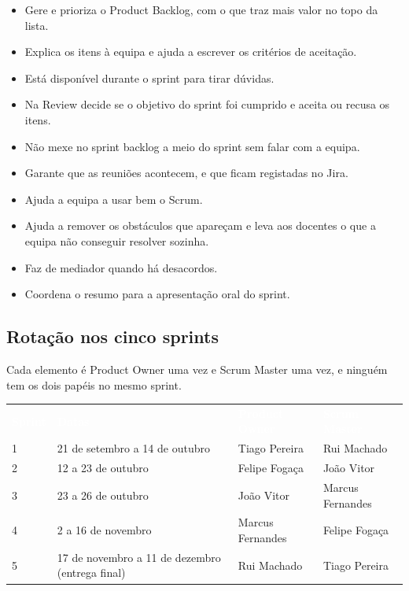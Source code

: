 \documentclass[11pt,a4paper]{article}
\newcommand{\th}[1]{\textcolor{white}{\sffamily\bfseries #1}}
\begin{document}
\begin{tcolorbox}[caixa, title={Product Owner}]
  \begin{itemize}
    \item Gere e prioriza o Product Backlog, com o que traz mais valor no topo da lista.
    \item Explica os itens à equipa e ajuda a escrever os critérios de aceitação.
    \item Está disponível durante o sprint para tirar dúvidas.
    \item Na Review decide se o objetivo do sprint foi cumprido e aceita ou recusa os itens.
    \item Não mexe no sprint backlog a meio do sprint sem falar com a equipa.
  \end{itemize}
\end{tcolorbox}

\begin{tcolorbox}[caixa, title={Scrum Master}]
  \begin{itemize}
    \item Garante que as reuniões acontecem, e que ficam registadas no Jira.
    \item Ajuda a equipa a usar bem o Scrum.
    \item Ajuda a remover os obstáculos que apareçam e leva aos docentes o que a equipa não conseguir resolver sozinha.
    \item Faz de mediador quando há desacordos.
    \item Coordena o resumo para a apresentação oral do sprint.
  \end{itemize}
\end{tcolorbox}

\subsection{Rotação nos cinco sprints}

Cada elemento é Product Owner uma vez e Scrum Master uma vez, e ninguém tem os dois papéis no mesmo sprint.

\renewcommand{\arraystretch}{1.5}
\begin{tabularx}{\textwidth}{N{1.6cm} L{5.2cm} Y Y}
   \th{Sprint} & \th{Datas} & \th{Product Owner} & \th{Scrum Master} \\
   1 & 21 de setembro a 14 de outubro & Tiago Pereira    & Rui Machado \\
          2 & 12 a 23 de outubro             & Felipe Fogaça    & João Vitor \\
   3 & 23 a 26 de outubro             & João Vitor       & Marcus Fernandes \\
          4 & 2 a 16 de novembro             & Marcus Fernandes & Felipe Fogaça \\
   5 & 17 de novembro a 11 de dezembro (entrega final) & Rui Machado & Tiago Pereira \\
  \bottomrule
\end{tabularx}
\renewcommand{\arraystretch}{1}
\end{document}
